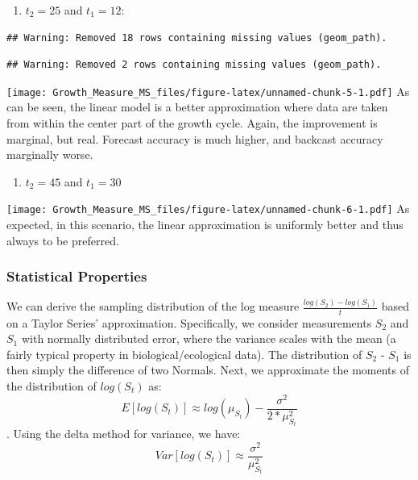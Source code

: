 \documentclass[]{article}
\providecommand{\tightlist}{%
  \setlength{\itemsep}{0pt}\setlength{\parskip}{0pt}}
\begin{document}
\begin{enumerate}
\def\labelenumi{\arabic{enumi})}
\setcounter{enumi}{1}
\tightlist
\item
  \(t_2 = 25\) and \(t_1 = 12\):
\end{enumerate}

\begin{verbatim}
## Warning: Removed 18 rows containing missing values (geom_path).
\end{verbatim}

\begin{verbatim}
## Warning: Removed 2 rows containing missing values (geom_path).
\end{verbatim}

\texttt{[image: Growth\_Measure\_MS\_files/figure-latex/unnamed-chunk-5-1.pdf]}
As can be seen, the linear model is a better approximation where data
are taken from within the center part of the growth cycle. Again, the
improvement is marginal, but real. Forecast accuracy is much higher, and
backcast accuracy marginally worse.

\begin{enumerate}
\def\labelenumi{\arabic{enumi})}
\setcounter{enumi}{2}
\tightlist
\item
  \(t_2=45\) and \(t_1=30\)
\end{enumerate}

\texttt{[image: Growth\_Measure\_MS\_files/figure-latex/unnamed-chunk-6-1.pdf]}
As expected, in this scenario, the linear approximation is uniformly
better and thus always to be preferred.

\subsubsection{Statistical Properties}\label{statistical-properties}

We can derive the sampling distribution of the log measure
\(\frac{log(S_2) - log(S_1)}{t}\) based on a Taylor Series'
approximation. Specifically, we consider measurements \(S_2\) and
\(S_1\) with normally distributed error, where the variance scales with
the mean (a fairly typical property in biological/ecological data). The
distribution of \(S_2\) - \(S_1\) is then simply the difference of two
Normals. Next, we approximate the moments of the distribution of
\(log(S_t)\) as:
\[E[log(S_t)] \approx log(\mu_{S_t}) - \frac{\sigma^2}{2*\mu_{S_t}^2}\].
Using the delta method for variance, we have:
\[Var[log(S_t)] \approx \frac{\sigma^2}{\mu_{S_t}^2}\]
\end{document}
